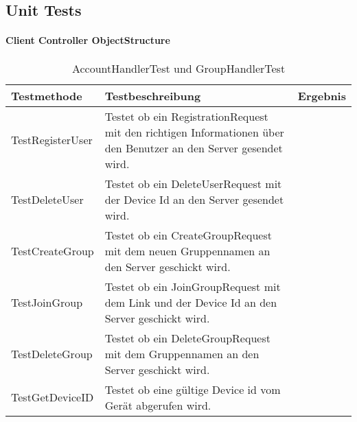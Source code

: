 \subsection{Unit Tests}
	\paragraph{Client Controller ObjectStructure}
	\begin{table}[H]
		{
			\begin{tabular}{|p{}|p{}|>{\centering}p{}|}
				\hline
				Testmethode & Testbeschreibung & Ergebnis\tabularnewline
				\hline
				\hspace{0pt}TestRegisterUser & Testet ob ein RegistrationRequest mit den richtigen Informationen über den Benutzer an den Server gesendet wird. &			\checkmark\tabularnewline
				\hspace{0pt}TestDeleteUser & Testet ob ein DeleteUserRequest mit der Device Id an den Server gesendet wird. & \checkmark\tabularnewline
				\hspace{0pt}TestCreateGroup & Testet ob ein CreateGroupRequest mit dem neuen Gruppennamen an den Server geschickt wird. & \checkmark\tabularnewline
				\hspace{0pt}TestJoinGroup & Testet ob ein JoinGroupRequest mit dem Link und der Device Id an den Server geschickt wird. & \checkmark\tabularnewline
				\hspace{0pt}TestDeleteGroup & Testet ob ein DeleteGroupRequest mit dem Gruppennamen an den Server geschickt wird. & \checkmark\tabularnewline
				\hspace{0pt}TestGetDeviceID & Testet ob eine gültige Device id vom Gerät abgerufen wird. & \checkmark\tabularnewline
				\hline
			\end{tabular}}
		\caption{AccountHandlerTest und GroupHandlerTest}
	\end{table}

